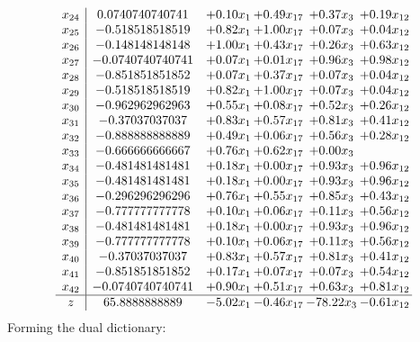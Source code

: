 \documentclass[8pt]{article}
\begin{document}
\[\begin{array}{c| c c@{\hskip 2pt} c@{\hskip 2pt} c@{\hskip 2pt} c@{\hskip 2pt} }
 x_{24}   &  0.0740740740741 & +  0.10 x_{1} & +  0.49 x_{17} & +  0.37 x_{3} & +  0.19 x_{12}\\
 x_{25}   &  -0.518518518519 & +  0.82 x_{1} & +  1.00 x_{17} & +  0.07 x_{3} & +  0.04 x_{12}\\
 x_{26}   &  -0.148148148148 & +  1.00 x_{1} & +  0.43 x_{17} & +  0.26 x_{3} & +  0.63 x_{12}\\
 x_{27}   &  -0.0740740740741 & +  0.07 x_{1} & +  0.01 x_{17} & +  0.96 x_{3} & +  0.98 x_{12}\\
 x_{28}   &  -0.851851851852 & +  0.07 x_{1} & +  0.37 x_{17} & +  0.07 x_{3} & +  0.04 x_{12}\\
 x_{29}   &  -0.518518518519 & +  0.82 x_{1} & +  1.00 x_{17} & +  0.07 x_{3} & +  0.04 x_{12}\\
 x_{30}   &  -0.962962962963 & +  0.55 x_{1} & +  0.08 x_{17} & +  0.52 x_{3} & +  0.26 x_{12}\\
 x_{31}   &  -0.37037037037 & +  0.83 x_{1} & +  0.57 x_{17} & +  0.81 x_{3} & +  0.41 x_{12}\\
 x_{32}   &  -0.888888888889 & +  0.49 x_{1} & +  0.06 x_{17} & +  0.56 x_{3} & +  0.28 x_{12}\\
 x_{33}   &  -0.666666666667 & +  0.76 x_{1} & +  0.62 x_{17} & +  0.00 x_{3} &   \\
 x_{34}   &  -0.481481481481 & +  0.18 x_{1} & +  0.00 x_{17} & +  0.93 x_{3} & +  0.96 x_{12}\\
 x_{35}   &  -0.481481481481 & +  0.18 x_{1} & +  0.00 x_{17} & +  0.93 x_{3} & +  0.96 x_{12}\\
 x_{36}   &  -0.296296296296 & +  0.76 x_{1} & +  0.55 x_{17} & +  0.85 x_{3} & +  0.43 x_{12}\\
 x_{37}   &  -0.777777777778 & +  0.10 x_{1} & +  0.06 x_{17} & +  0.11 x_{3} & +  0.56 x_{12}\\
 x_{38}   &  -0.481481481481 & +  0.18 x_{1} & +  0.00 x_{17} & +  0.93 x_{3} & +  0.96 x_{12}\\
 x_{39}   &  -0.777777777778 & +  0.10 x_{1} & +  0.06 x_{17} & +  0.11 x_{3} & +  0.56 x_{12}\\
 x_{40}   &  -0.37037037037 & +  0.83 x_{1} & +  0.57 x_{17} & +  0.81 x_{3} & +  0.41 x_{12}\\
 x_{41}   &  -0.851851851852 & +  0.17 x_{1} & +  0.07 x_{17} & +  0.07 x_{3} & +  0.54 x_{12}\\
 x_{42}   &  -0.0740740740741 & +  0.90 x_{1} & +  0.51 x_{17} & +  0.63 x_{3} & +  0.81 x_{12}\\
\hline
z    &  65.8888888889 & -5.02 x_{1} & -0.46 x_{17} & -78.22 x_{3} & -0.61 x_{12}\\
\end{array}\]
Forming the dual dictionary:
\end{document}
